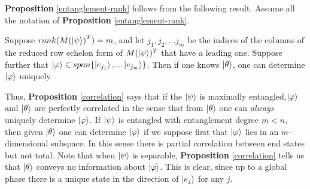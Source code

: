 {\bf{Proposition}} \ref{entanglement-rank} follows from the following result.  Assume all the notation of {\bf{Proposition}} \ref{entanglement-rank}.
\begin{prop}
\label{correlation}
Suppose $rank({M(\ket{\psi})}^T)=m$, and let $j_1, j_2, ... j_m$ be the indices of the columns of the reduced row echelon form of $M(\ket{\psi})^T$ that have a leading one.  Suppose further that $\ket{\varphi} \in span\{\ket{e_{j_1}}, ... \ket{e_{j_m}}\}$.  Then if one knows $\ket{\theta}$, one can determine $\ket{\varphi}$ uniquely.  
\end{prop}
Thus, {\bf{Proposition}} \ref{correlation} says that if the $\ket{\psi}$ is maximally entangled,$\ket{\varphi}$ and $\ket{\theta}$ are perfectly correlated in the sense that from $\ket{\theta}$ one can {\emph{always}} uniquely determine $\ket{\varphi}$.  If $\ket{\psi}$ is entangled with entanglement degree $m<n$, then given $\ket{\theta}$ one can determine $\ket{\varphi}$ if we suppose first that $\ket{\varphi}$ lies in an $m$-dimensional subspace.  In this sense there is partial correlation between end states but not total.  Note that when $\ket{\psi}$ is separable, {\bf{Proposition}} \ref{correlation} tells us that $\ket{\theta}$ conveys no information about $\ket{\varphi}$.  This is clear, since up to a global phase there is a unique state in the direction of $\ket{e_j}$ for any $j$.

